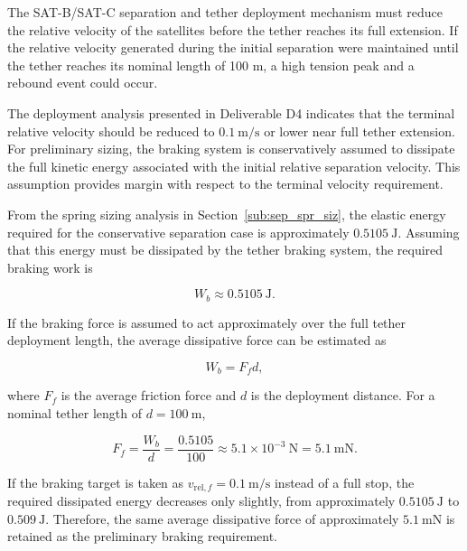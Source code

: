 The SAT-B/SAT-C separation and tether deployment mechanism must reduce the relative velocity of the satellites before the tether reaches its full extension. If the relative velocity generated during the initial separation were maintained until the tether reaches its nominal length of 100 m, a high tension peak and a rebound event could occur.

The deployment analysis presented in Deliverable D4 indicates that the terminal relative velocity should be reduced to \(0.1~\mathrm{m/s}\) or lower near full tether extension. For preliminary sizing, the braking system is conservatively assumed to dissipate the full kinetic energy associated with the initial relative separation velocity. This assumption provides margin with respect to the terminal velocity requirement.

From the spring sizing analysis in Section~\ref{sub:sep_spr_siz}, the elastic energy required for the conservative separation case is approximately \(0.5105~\mathrm{J}\). Assuming that this energy must be dissipated by the tether braking system, the required braking work is

\begin{equation}
W_b \approx 0.5105~\mathrm{J}.
\label{eq:braking_work_full_stop}
\end{equation}

If the braking force is assumed to act approximately over the full tether deployment length, the average dissipative force can be estimated as

\begin{equation}
W_b = F_f d,
\label{eq:braking_work_friction}
\end{equation}

where \(F_f\) is the average friction force and \(d\) is the deployment distance. For a nominal tether length of \(d=100~\mathrm{m}\),

\begin{equation}
F_f =
\frac{W_b}{d}
=
\frac{0.5105}{100}
\approx
5.1\times10^{-3}~\mathrm{N}
=
5.1~\mathrm{mN}.
\label{eq:average_friction_force_value}
\end{equation}

If the braking target is taken as \(v_{\mathrm{rel},f}=0.1~\mathrm{m/s}\) instead of a full stop, the required dissipated energy decreases only slightly, from approximately \(0.5105~\mathrm{J}\) to \(0.509~\mathrm{J}\). Therefore, the same average dissipative force of approximately \(5.1~\mathrm{mN}\) is retained as the preliminary braking requirement.

